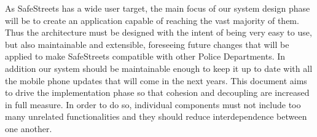 As SafeStreets has a wide user target, the main focus of our system design phase will be to create an application capable of reaching the vast majority of them. 
Thus the architecture must be designed with the intent of being very easy to use, but also maintainable and extensible, foreseeing future changes that will be applied to make SafeStreets compatible with other Police Departments.
In addition our system should be maintainable enough to keep it up to date with all the mobile phone updates that will come in the next years. 
This document aims to drive the implementation phase so that cohesion and decoupling are increased in full measure. In order to do so, individual components must not include too many unrelated functionalities and they should reduce interdependence between one another.